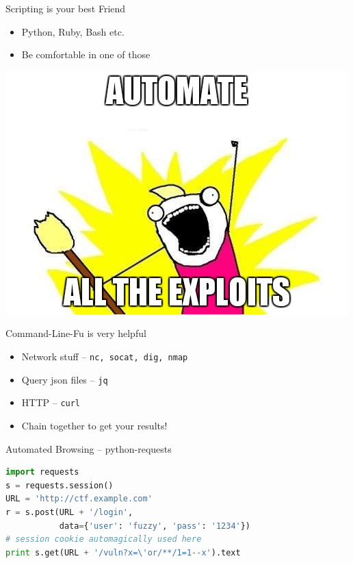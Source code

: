 \begin{frame}
  {Scripting is your best Friend}

  \begin{itemize}
    \item Python, Ruby, Bash etc.
    \item Be comfortable in one of those
  \end{itemize}

  \begin{center}
    \includegraphics[height=0.5\textheight]{images/automatealltheexploits.jpg}
  \end{center}
\end{frame}


\begin{frame}
  {Command-Line-Fu is very helpful}

  \begin{itemize}
    \item Network stuff -- \texttt{nc, socat, dig, nmap}
    \item Query json files -- \texttt{jq}
    \item HTTP -- \texttt{curl}
  \end{itemize}

  \begin{itemize}
    \item Chain together to get your results!
  \end{itemize}
\end{frame}


\begin{frame}[fragile]
  {Automated Browsing -- python-requests}

  \begin{lstlisting}[language=python]
import requests
s = requests.session()
URL = 'http://ctf.example.com'
r = s.post(URL + '/login',
           data={'user': 'fuzzy', 'pass': '1234'})
# session cookie automagically used here
print s.get(URL + '/vuln?x=\'or/**/1=1--x').text
  \end{lstlisting}
\end{frame}

